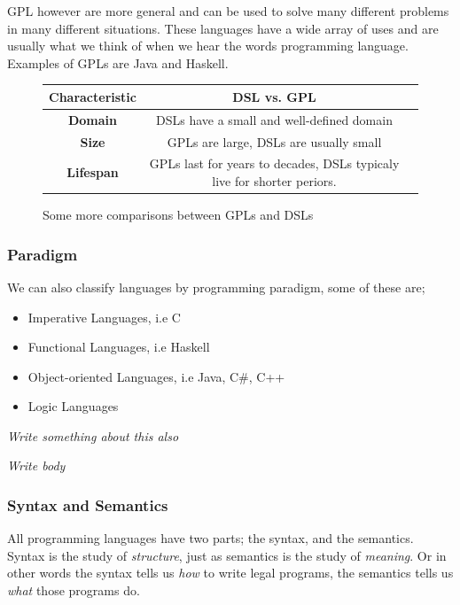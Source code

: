 \documentclass[tikz, border=5mm]{article}
\DeclareRobustCommand{\comment}[1]{
    {\color{orange}\emph{#1}}
}
\begin{document}
        \Gls{GPL} however are more general and can be used to solve many different problems in many different situations.
        These languages have a wide array
        of uses and are usually what we think of when we hear the words programming language. Examples of GPLs are Java and Haskell.\\
        \begin{figure}[!h]
            \begin{tabular}{|c|c|c}
                \hline
                \textbf{Characteristic} &\textbf{DSL vs. GPL}\\
                \hline
                \textbf{Domain} & DSLs have a small and well-defined domain\\
                \hline
                \textbf{Size} &GPLs are large, DSLs are usually small\\
                \hline
                \textbf{Lifespan} &GPLs last for years to decades, DSLs typicaly live for shorter periors.\\
                \hline
            \end{tabular}%
            \caption{Some more comparisons between GPLs and DSLs}
        \end{figure}%

        \subsubsection*{Paradigm}
        We can also classify languages by programming paradigm, some of these are; 
        \begin{itemize}
            \item Imperative Languages, i.e C
            \item Functional Languages, i.e Haskell
            \item Object-oriented Languages, i.e Java, C\#, C++
            \item Logic Languages
        \end{itemize}
        \comment{Write something about this also}
        \comment{Write body}

        \subsubsection*{Syntax and Semantics}
        All programming languages have two parts; the \gls{syntax}, and the \gls{semantics}.\\
        Syntax is the study of \textit{structure}, just as semantics is the study of \textit{meaning}. Or in other words
        the syntax tells us \textit{how} to write legal programs, the semantics tells us \textit{what} those programs do. 
\end{document}
